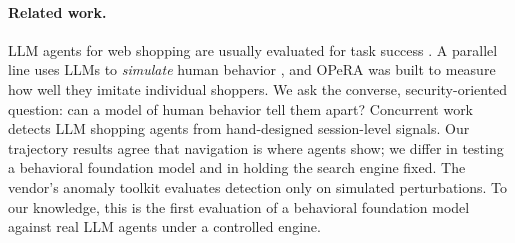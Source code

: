 \paragraph{Related work.} LLM agents for web shopping are usually evaluated for task success \cite{yao2022webshop,deng2023mind2web,zhou2023webarena,zeng2023agenttuning}. A parallel line uses LLMs to \emph{simulate} human behavior \cite{park2023generative}, and OPeRA \cite{wang2025opera} was built to measure how well they imitate individual shoppers. We ask the converse, security-oriented question: can a model of human behavior tell them apart? Concurrent work \cite{dutta2026habits} detects LLM shopping agents from hand-designed session-level signals. Our trajectory results agree that navigation is where agents show; we differ in testing a behavioral foundation model and in holding the search engine fixed. The vendor's anomaly toolkit \cite{unbox2026anomaly} evaluates detection only on simulated perturbations. To our knowledge, this is the first evaluation of a behavioral foundation model against real LLM agents under a controlled engine.
